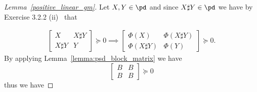 \documentclass[twoside,11pt]{article}
\begin{document}
\begin{proof}[Lemma~\ref{positive_linear_gm}]
        Let $X, Y \in \pd$ and since $X \sharp Y \in \pd$ we have by Exercise 3.2.2 (ii)~\cite{bhatia07positivedefinitematrices} that 

         \begin{equation}\label{eq:Phi_succ_0}
        \begin{aligned}
        \begin{bmatrix}
            X  & X \sharp Y  
            \\ X\sharp Y   &Y 
        \end{bmatrix} \succeq 0 \implies 
\begin{bmatrix}
            \Phi(X)  & \Phi\left(X \sharp Y\right)  
            \\ \Phi\left(X\sharp Y\right)   &\Phi(Y) 
        \end{bmatrix}
        \succeq 0 .
        \end{aligned}
    \end{equation}
By applying Lemma~\ref{lemma:psd_block_matrix} we have
\[
\begin{bmatrix}
            B & B \\
            B & B
        \end{bmatrix} \succeq 0
\]
thus we have


\end{proof}
\end{document}
